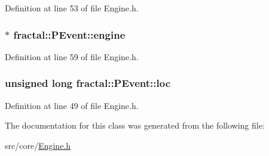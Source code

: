 Definition at line 53 of file Engine.\+h.

\hypertarget{classfractal_1_1PEvent_a9e6bab27d00cf626cf5c0047a2b2977d}{
\subsubsection[{engine}]{$\ast$ fractal\+::\+P\+Event\+::engine}}\label{classfractal_1_1PEvent_a9e6bab27d00cf626cf5c0047a2b2977d}


Definition at line 59 of file Engine.\+h.

\hypertarget{classfractal_1_1PEvent_ae2c92e05304c05636ebe15728d13788f}{
\subsubsection[{loc}]{\setlength{\rightskip}{0pt plus 5cm}unsigned long fractal\+::\+P\+Event\+::loc}}\label{classfractal_1_1PEvent_ae2c92e05304c05636ebe15728d13788f}


Definition at line 49 of file Engine.\+h.



The documentation for this class was generated from the following file\+:\begin{DoxyCompactItemize}
\item 
src/core/\hyperlink{Engine_8h}{Engine.\+h}\end{DoxyCompactItemize}
